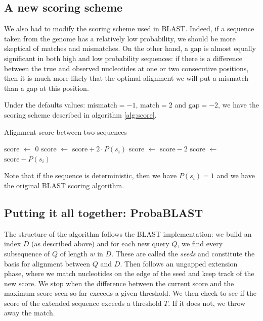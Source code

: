 \documentclass[11pt]{IEEEtran}
\newcommand*\Let[2]{\State #1 $\gets$ #2}
\begin{document}
\subsection{A new scoring scheme}

We also had to modify the scoring scheme used in BLAST. Indeed, if a sequence taken from the genome has a relatively low probability, we should be more skeptical of matches and mismatches. On the other hand, a gap is almost equally significant in both high and low probability sequences: if there is a difference between the true and observed nucleotides at one or two consecutive positions, then it is much more likely that the optimal alignment we will put a mismatch than a gap at this position.

Under the defaults values: $\text{mismatch}= -1$, $\text{match}= 2$ and $\text{gap} = -2$, we have the scoring scheme described in algorithm \ref{alg:score}.

\begin{algorithm}
  \caption{Alignment score between two sequences
    \label{alg:score}}
  \begin{algorithmic}[1]
    \Statex
      \Let{$\text{score}$}{$0$}
            \Let{$\text{score}$}{$\text{score} + 2\cdot P(s_i)$}
    \Let{$\text{score}$}{$\text{score} - 2$}
  \Else 
    \Let{$\text{score}$}{$\text{score} - P(s_i)$}
        \EndIf
      \EndFor
      \State {}
    \EndFunction
  \end{algorithmic}
\end{algorithm}

Note that if the sequence is deterministic, then we have $P(s_i) = 1$ and we have the original BLAST scoring algorithm. 

\subsection{Putting it all together: ProbaBLAST}

The structure of the algorithm follows the BLAST implementation: we build an index $D$ (as described above) and for each new query $Q$, we find every subsequence of $Q$ of length $w$ in $D$. These are called the \emph{seeds} and constitute the basis for alignment between $Q$ and $D$. Then follows an ungapped extension phase, where we match nucleotides on the edge of the seed and keep track of the new score. We stop when the difference between the current score and the maximum score seen so far exceeds a given threshold. We then check to see if the score of the extended sequence exceeds a threshold $T$. If it does not, we throw away the match. 
\end{document}
